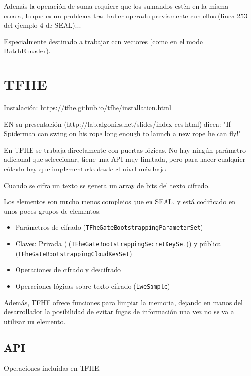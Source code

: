 Además la operación de suma requiere que los sumandos estén en la misma escala, lo que es un problema tras haber operado previamente con ellos (linea 253 del ejemplo 4 de SEAL)...

Especialmente destinado a trabajar con vectores (como en el modo BatchEncoder).

\section{TFHE}

Instalación: https://tfhe.github.io/tfhe/installation.html

EN su presentación (http://lab.algonics.net/slides/index-ccs.html) dicen: "If Spiderman can swing on his rope long enough to launch a new rope he can fly!"

En TFHE se trabaja directamente con puertas lógicas. No hay ningún parámetro adicional que seleccionar, tiene una API muy limitada, pero para hacer cualquier cálculo hay que implementarlo desde el nivel más bajo.

Cuando se cifra un texto se genera un array de bits del texto cifrado.

Los elementos son mucho menos complejos que en SEAL, y está codificado en unos pocos grupos de elementos:

\begin{itemize}
  \item Parámetros de cifrado (\texttt{TFheGateBootstrappingParameterSet})
  \item Claves: Privada ( (\texttt{TFheGateBootstrappingSecretKeySet})) y pública (\texttt{TFheGateBootstrappingCloudKeySet})
  \item Operaciones de cifrado y descifrado
  \item Operaciones lógicas sobre texto cifrado (\texttt{LweSample})
\end{itemize}

Además, TFHE ofrece funciones para limpiar la memoria, dejando en manos del desarrollador la posibilidad de evitar fugas de información una vez no se va a utilizar un elemento.

\subsection{API}

Operaciones incluidas en TFHE.

